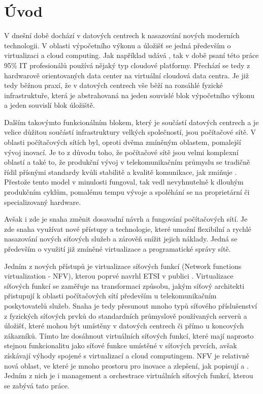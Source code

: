 
\chapter{Úvod}

V dnešní době dochází v datových centrech k nasazování nových moderních technologii. V oblasti výpočetního výkonu a úložišť se jedná především o virtualizaci a cloud computing. Jak například udává \cite{Cloud_adoption} , tak v době psaní této práce 95\% IT profesionálů používá nějaký typ cloudové platformy. Přechází se tedy z hardwarově orientovaných data center na virtuální cloudová data centra. Je již tedy běžnou praxí, že v datových centrech vše běží na rozsáhlé fyzické infrastruktuře, která je abstrahovaná na jeden souvislé blok výpočetního výkonu a jeden souvislí blok úložiště.

Dalším takovýmto funkcionálním blokem, který je součástí datových centrech a je velice důžitou součástí infrastruktury velkých společností, jsou počítačové sítě. V oblasti počítačových sítích byl, oproti dvěma zmíněným oblastem, pomalejší vývoj inovací. Je to z důvodu toho, že počítačové sítě jsou velmi komplexní oblastí a také to, že produkční vývoj v telekomunikačním průmyslu se tradičně řídil přísnými standardy kvůli stabilitě a kvalitě komunikace, jak zmiňuje \cite{telco} . Přestože tento model v minulosti fungoval, tak vedl nevyhnutelně k dlouhým produkčním cyklům, pomalému tempu vývoje a spoléhání se na proprietární či specializovaný hardware.  

Avšak i zde je snaha změnit dosavadní návrh a fungování počítačových sítí. Je zde snaha využívat nové přístupy a technologie, které umožní flexibilní a rychlé nasazování nových síťových služeb a zárověň snížit jejich náklady. Jedná se především o využití již zmíněné virtualizace a programatické správy sítě. \cite{Toward_Unified}

Jedním z nových přístupů je virtualizace síťových funkcí (Network functions virtualization - NFV), kterou poprvé navrhl ETSI v publici \cite{NFV_paper2012} . Virtualizace síťových funkcí se zaměřuje na transformaci způsobu, jakým síťový architekti přistupují k oblasti počítačových sítí především u telekomunikačním poskytovatelů služeb. Snaha je tedy přesunout mnoho typů síťového příslušenství z fyzických síťových prvků do standardních průmyslově používaných serverů a úložišť, které mohou být umístěny v datových centrech či přímo u koncových zákazníků. Tímto lze dosáhnout virtuálních síťových funkcí, které mají naprosto stejnou funkcionalitu jako síťové funkce umístěné v síťových prvcích, avšak získávají výhody spojené s virtualizací a cloud computingem. NFV je relativně nová oblast, ve které je mnoho prostoru pro inovace a zlepšení, jak popisují \cite{NFVChalanges} a \cite{NFVState}. Jedním z nich je i management a orchestrace virtuálních síťových funkcí, kterou se zabývá tato práce.

